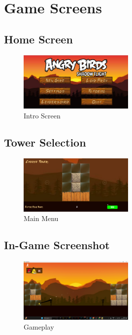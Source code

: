 \documentclass[10pt]{article}
\begin{document}
\section{Game Screens}\label{sec:screens}

\subsection{Home Screen}
\begin{figure}[h!]
    \centering
    \includegraphics[width=0.5\textwidth]{home.png}
    \caption{Intro Screen}
\end{figure}

\subsection{Tower Selection}
\begin{figure}[h!]
    \centering
    \includegraphics[width=0.5\textwidth]{selection.png}
    \caption{Main Menu}
\end{figure}

\subsection{In-Game Screenshot}
\begin{figure}[h!]
    \centering
    \includegraphics[width=0.5\textwidth]{game.png}
    \caption{Gameplay}
\end{figure}
\end{document}
